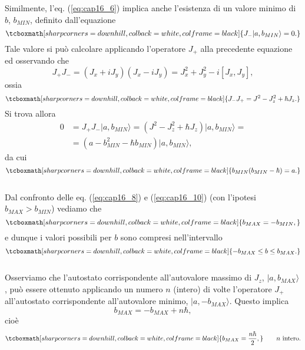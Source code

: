 Similmente, l'eq. (\ref{eq:cap16_6}) implica anche l'esistenza di un valore minimo di $b$,  $b_{MIN}$, definito dall'equazione
	\begin{equation}
		\tcboxmath[sharp corners=downhill, colback=white, colframe=black]{
			J_{-} \vert a, b_{MIN} \rangle =0.
			}
	\end{equation}
Tale valore si può calcolare applicando l'operatore $J_+$ alla precedente equazione ed osservando che
	\begin{equation}
		J_+J_- = (J_x+iJ_y)(J_x-iJ_y)= J_x^2 +J_y ^2-i[J_x, J_y] ,
	\end{equation}
ossia
	\begin{equation}
		\tcboxmath[sharp corners=downhill, colback=white, colframe=black]{
			J_-J_+ = J^2 -J_z ^2 +\hbar J_z .
			}
	\label{eq:cap16_9}
	\end{equation}
Si trova allora
	\begin{align}
		0&=J_{+}J_{-} \vert a, b_{MIN} \rangle = (J^2 -J_z ^2 +\hbar J_z)\vert a, b_{MIN} \rangle = \nonumber \\
		&=(a- b_{MIN} ^2 - \hbar b_{MIN} )\vert a, b_{MIN} \rangle ,
	\end{align}
da cui
	\begin{equation}
		\tcboxmath[sharp corners=downhill, colback=white, colframe=black]{
			b_{MIN}(b_{MIN}-\hbar) =a .
			}
	\label{eq:cap16_10}
	\end{equation}\\
	
Dal confronto delle eq. (\ref{eq:cap16_8}) e (\ref{eq:cap16_10}) (con l'ipotesi $b_{MAX} > b_{MIN}$) vediamo che
	\begin{equation}
		\tcboxmath[sharp corners=downhill, colback=white, colframe=black]{
			b_{MAX} = - b_{MIN} ,
			}
	\end{equation}
e dunque i valori possibili per $b$ sono compresi nell'intervallo
	\begin{equation}
		\tcboxmath[sharp corners=downhill, colback=white, colframe=black]{
			-b_{MAX} \leq b \leq b_{MAX} .
			}
	\end{equation}\\
	
Osserviamo che l'autostato corrispondente all'autovalore massimo di $J_z$, $\vert a, b_{MAX}\rangle$, può essere ottenuto applicando un numero $n$ (intero) di volte l'operatore $J_+$ all'autostato corrispondente all'autovalore minimo, $\vert a, - b_{MAX}\rangle $. Questo implica
	\begin{equation}
		b_{MAX}=-b_{MAX}+n\hbar, 
	\end{equation}
cioè
	\begin{equation}
		\tcboxmath[sharp corners=downhill, colback=white, colframe=black]{
			b_{MAX}=\frac{n\hbar}{2},
			} \qquad n\textrm{ intero.}
	\end{equation}\\
	
